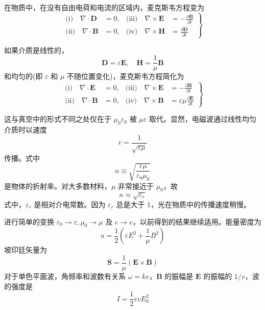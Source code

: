 在物质中，在没有自由电荷和电流的区域内，麦克斯韦方程变为
\begin{equation}
\left.\begin{aligned}
\text{(i)} \quad \nabla \cdot \boldsymbol{D} &= 0, & \text{(iii)} \quad \nabla \times \boldsymbol{E} &= -\frac{\partial \boldsymbol{B}}{\partial t} \\
\text{(ii)} \quad \nabla \cdot \boldsymbol{B} &= 0, & \text{(iv)} \quad \nabla \times \boldsymbol{H} &= \frac{\partial \boldsymbol{D}}{\partial t}
\end{aligned}\right\}
\end{equation}

\noindent 如果介质是线性的，
\begin{equation}
\boldsymbol{D} = \varepsilon \boldsymbol{E}, \quad \boldsymbol{H} = \frac{1}{\mu} \boldsymbol{B}
\end{equation}
和均匀的(即 $\varepsilon$ 和 $\mu$ 不随位置变化)，麦克斯韦方程简化为
\begin{equation}
\left.\begin{aligned}
\text{(i)} \quad \nabla \cdot \boldsymbol{E} &= 0, & \text{(iii)} \quad \nabla \times \boldsymbol{E} &= -\frac{\partial \boldsymbol{B}}{\partial t} \\
\text{(ii)} \quad \nabla \cdot \boldsymbol{B} &= 0, & \text{(iv)} \quad \nabla \times \boldsymbol{B} &= \varepsilon\mu \frac{\partial \boldsymbol{E}}{\partial t}
\end{aligned}\right\}\label{线性均匀麦克斯韦方程}
\end{equation}

\noindent 这与真空中的形式不同之处仅在于 $\mu_0\varepsilon_0$ 被 $\mu\varepsilon$ 取代。显然，电磁波通过线性均匀介质时以速度
\begin{equation}
v = \frac{1}{\sqrt{\varepsilon\mu}}
\end{equation}
传播。式中
\begin{equation}
n \equiv \sqrt{\frac{\varepsilon\mu}{\varepsilon_0\mu_0}}
\end{equation}
是物体的折射率。对大多数材料，$\mu$ 非常接近于 $\mu_0$，故
\begin{equation}
n \approx  \sqrt{\varepsilon_r}
\end{equation}
式中，$\varepsilon_r$ 是相对介电常数。因为 $\varepsilon_r$ 总是大于 1，光在物质中的传播速度稍慢。

进行简单的变换 $\varepsilon_0 \rightarrow \varepsilon, \mu_0 \rightarrow \mu$ 及 $c \rightarrow v$，以前得到的结果继续适用。能量密度为
\begin{equation}
u = \frac{1}{2}\left( \varepsilon E^2 + \frac{1}{\mu} B^2 \right)
\end{equation}
坡印廷矢量为
\begin{equation}
\boldsymbol{S} = \frac{1}{\mu}(\boldsymbol{E} \times \boldsymbol{B})
\end{equation}
对于单色平面波，角频率和波数有关系 $\omega = kv$，$\boldsymbol{B}$ 的振幅是 $\boldsymbol{E}$ 的振幅的 $1/v$，波的强度是
\begin{equation}
I = \frac{1}{2} \varepsilon v E_0^2
\end{equation}
